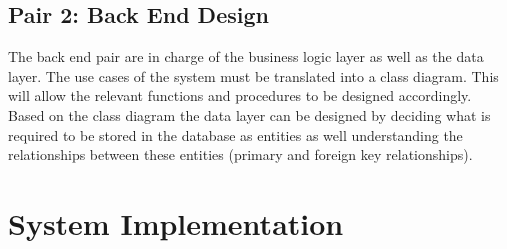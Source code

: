 \documentclass[paper=a4, fontsize=11pt]{scrartcl}
\numberwithin{equation}{section}		%
\numberwithin{figure}{section}			%
\numberwithin{table}{section}				%
\begin{document}
\subsection{Pair 2: Back End Design}
The back end pair are in charge of the business logic layer as well as the data layer. The use cases of the system must be translated into a class diagram. This will allow the relevant functions and procedures to be designed accordingly. Based on the class diagram the data layer can be designed by deciding what is required to be stored in the database as entities as well understanding the relationships between these entities (primary and foreign key relationships).
\section{System Implementation}
\end{document}
